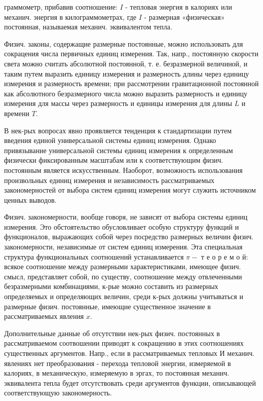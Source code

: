\documentclass[10pt]{article}
\begin{document}
граммометр, прибавив соотношение: $I$ - тепловая энергия в калориях или механич. энергия в килограммометрах, где $I$ - размерная «физическая» постоянная, называемая механич. эквивалентом тепла.



Физич. законы, содержащие размерные постоянные, можно использовать для сокрацения числа первичных единиц измерения. Так, напр., постоянную скорости света можно считать абсолютной постоянной, т. е. безразмерной величиной, и таким путем выразить единицу измерения и размерность длины через единицу измерения и размерность времени; при рассмотрении гравитационной постоянной как абсолютного безразмерного числа можно выразить размерность и единицу измерения для массы через размерность и единицы измерения для длины $L$ и времени $T$.



В нек-рых вопросах явно проявляется тенденция к стандартизации путем введения единой универсальной системы единиц измерения. Однако привязывание универсальной системы единиц измерения к определенным физически фиксированным масштабам или к соответствующим физич. постоянным является искусственным. Наоборот, возможность использования произвольных единиц измерения и независимость рассматриваемых закономерностей от выбора систем единиц измерения могут служить источником ценных выводов.



Физич. закономерности, вообще говоря, не зависят от выбора системы единиц измерения. Это обстоятельство обусловливает особую структуру функций и функционалов, выражающих собой через посредство размерных величин физич. закономерности, независимые от систем единиц измерения. Эта специальная структура функциональных соотношений устанавливается $\pi-$ т е о р е м о й: всякое соотношение между размерными характеристиками, имеющее физич. смысл, представляет собой, по существу, соотношение между отвлеченными безразмерными комбинациями, к-рые можно составить из размерных определяемых и определяющих величин, среди к-рых должны учитываться и размерные физич. постоянные, имеющие существенное значение в рассматриваемых явления $x$.



Дополнительные данные об отсутствии нек-рых физич. постоянных в рассматриваемом соотвошении приводят к сокращению в этих соотношениях существенных аргументов. Напр., если в рассматриваемых тепловых И механич. явлениях нет преобразования - перехода тепловой энергии, измеряемой в калориях, в механическую, измеряемую в эргах, то постоянная механич. эквивалента тепла будет отсутствовать среди аргументов функции, описывающей соответствующую закономерность.
\end{document}
